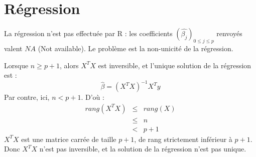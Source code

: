 \documentclass[a4paper, 12pt]{article}
\begin{document}
\section{Régression}
%

La régression n'est pas effectuée par R : les coefficients $(\hat{\beta_{j}})_{0 \leq j \leq p}$ renvoyés valent $NA$ (Not available). Le problème est la non-unicité de la régression.

Lorsque $n \geq p+1$, alors $X^{T} X$ est inversible, et l'unique solution de la régression est :
\begin{displaymath}
\hat{\beta} = (X^{T} X)^{-1} X^{T} y
\end{displaymath}
Par contre, ici, $n < p+1$.
D'où :
\begin{eqnarray*}
rang(X^{T} X) & \leq & rang(X) \\
& \leq & n \\
& < & p+1
\end{eqnarray*}
$X^{T} X$ est une matrice carrée de taille $p+1$, de rang strictement inférieur à $p+1$. Donc $X^{T} X$ n'est pas inversible, et la solution de la régression n'est pas unique.
\end{document}
